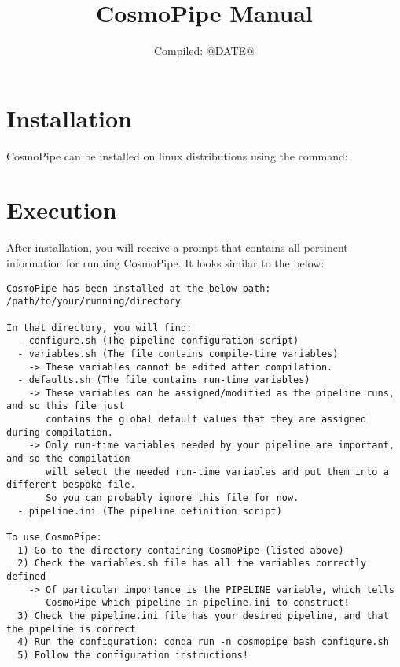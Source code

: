 \documentclass[fleqn,usenatbib]{mnras}
\title[CosmoPipe Manual]{CosmoPipe Manual}
\date{Compiled: @DATE@}
\begin{document}
\setlength{\voffset}{-12mm}

\doparttoc %
\faketableofcontents %
\noptcrule  %

\maketitle

\section{Installation}
CosmoPipe can be installed on linux distributions using the command: 

\section{Execution} 
After installation, you will receive a prompt that contains all pertinent information for running CosmoPipe. 
It looks similar to the below: 

\begin{verbatim}
CosmoPipe has been installed at the below path:
/path/to/your/running/directory

In that directory, you will find: 
  - configure.sh (The pipeline configuration script)
  - variables.sh (The file contains compile-time variables)
    -> These variables cannot be edited after compilation.
  - defaults.sh (The file contains run-time variables)
    -> These variables can be assigned/modified as the pipeline runs, and so this file just
       contains the global default values that they are assigned during compilation. 
    -> Only run-time variables needed by your pipeline are important, and so the compilation
       will select the needed run-time variables and put them into a different bespoke file.
       So you can probably ignore this file for now.
  - pipeline.ini (The pipeline definition script)

To use CosmoPipe: 
  1) Go to the directory containing CosmoPipe (listed above)
  2) Check the variables.sh file has all the variables correctly defined
    -> Of particular importance is the PIPELINE variable, which tells
       CosmoPipe which pipeline in pipeline.ini to construct!
  3) Check the pipeline.ini file has your desired pipeline, and that the pipeline is correct
  4) Run the configuration: conda run -n cosmopipe bash configure.sh 
  5) Follow the configuration instructions! 
\end{verbatim}
\end{document}
